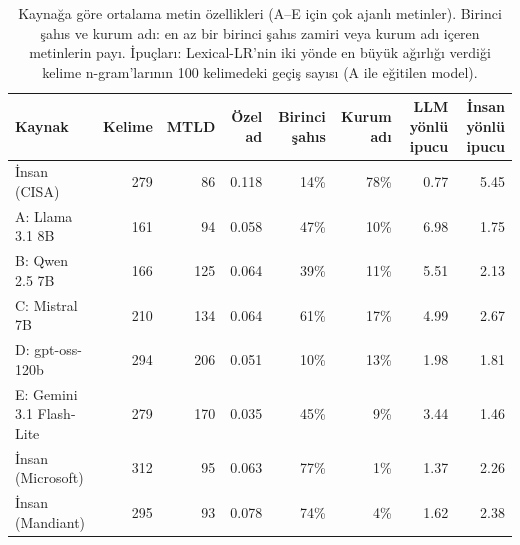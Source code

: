 \begin{table}[t]
\centering
\footnotesize
\caption{Kaynağa göre ortalama metin özellikleri (A--E için çok ajanlı metinler). Birinci şahıs ve kurum adı: en az bir birinci şahıs zamiri veya kurum adı içeren metinlerin payı. İpuçları: Lexical-LR'nin iki yönde en büyük ağırlığı verdiği kelime n-gram'larının 100 kelimedeki geçiş sayısı (A ile eğitilen model).}
\label{tab:profile}
\begin{tabular}{lrrrrrrr}
\toprule
Kaynak & Kelime & MTLD & Özel ad & Birinci şahıs & Kurum adı & LLM yönlü ipucu & İnsan yönlü ipucu \\
\midrule
İnsan (CISA) & 279 & 86 & 0.118 & 14\% & 78\% & 0.77 & 5.45 \\
A: Llama 3.1 8B & 161 & 94 & 0.058 & 47\% & 10\% & 6.98 & 1.75 \\
B: Qwen 2.5 7B & 166 & 125 & 0.064 & 39\% & 11\% & 5.51 & 2.13 \\
C: Mistral 7B & 210 & 134 & 0.064 & 61\% & 17\% & 4.99 & 2.67 \\
D: gpt-oss-120b & 294 & 206 & 0.051 & 10\% & 13\% & 1.98 & 1.81 \\
E: Gemini 3.1 Flash-Lite & 279 & 170 & 0.035 & 45\% & 9\% & 3.44 & 1.46 \\
İnsan (Microsoft) & 312 & 95 & 0.063 & 77\% & 1\% & 1.37 & 2.26 \\
İnsan (Mandiant) & 295 & 93 & 0.078 & 74\% & 4\% & 1.62 & 2.38 \\
\bottomrule
\end{tabular}
\end{table}
